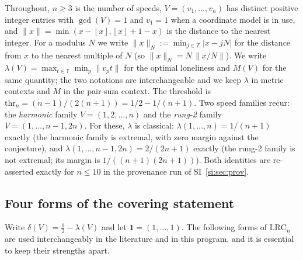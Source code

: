 \documentclass[11pt,a4paper]{article}
\numberwithin{equation}{section}
\theoremstyle{plain}
\theoremstyle{definition}
\theoremstyle{remark}
\newcommand{\Z}{\mathbb{Z}}
\newcommand{\T}{\mathbb{T}}
\newcommand{\floor}[1]{\left\lfloor #1 \right\rfloor}
\newcommand{\wn}[1]{\lVert #1 \rVert_{N}}
\newcommand{\wnc}[1]{\lVert #1 \rVert}
\newcommand{\lrc}{\mathrm{LRC}}
\begin{document}
Throughout, $n\ge 3$ is the number of speeds, $V=(v_1,\dots,v_n)$ has
distinct positive integer entries with $\gcd(V)=1$ and $v_1=1$ when a
coordinate model is in use, and $\wnc{x}=\min(x-\floor{x},
\floor{x}+1-x)$ is the distance to the nearest integer. For a modulus
$N$ we write $\wn{x}:=\min_{j\in\Z}|x-jN|$ for the distance from $x$ to
the nearest multiple of $N$ (so $\wn{x}=N\,\wnc{x/N}$). We write
$\lambda(V)=\max_{t\in\T}\min_p \wnc{v_p t}$ for the optimal loneliness
and $M(V)$ for the same quantity; the two notations are interchangeable
and we keep $\lambda$ in metric contexts and $M$ in the
pair-sum context. The threshold is
$\mathrm{thr}_n=(n-1)/(2(n+1))=1/2-1/(n+1)$. Two speed families recur:
the \emph{harmonic} family $V=(1,2,\dots,n)$ and the \emph{rung-2}
family $V=(1,\dots,n-1,2n)$. For these, $\lambda$ is classical:
$\lambda(1,\dots,n)=1/(n+1)$ exactly (the harmonic family is extremal,
with zero margin against the conjecture), and
$\lambda(1,\dots,n-1,2n)=2/(2n+1)$ exactly (the rung-2 family is not
extremal; its margin is $1/((n+1)(2n+1))$). Both identities are
re-asserted exactly for $n\le 10$ in the provenance run of
SI~\ref{si:sec:prov}.

\subsection{Four forms of the covering statement}

Write $\delta(V)=\tfrac12-\lambda(V)$ and let $\mathbf{1}=(1,\dots,1)$.
The following forms of $\lrc_n$ are used interchangeably in the
literature and in this program, and it is essential to keep their
strengths apart.
\end{document}
